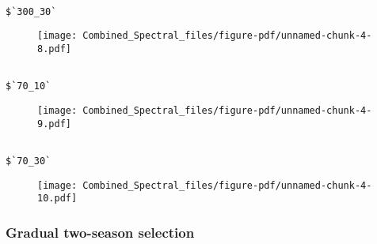 \documentclass[
  letterpaper,
  DIV=11,
  numbers=noendperiod]{scrartcl}
\newenvironment{Shaded}{\begin{snugshade}}{\end{snugshade}}
\newcommand{\FunctionTok}[1]{\textcolor[rgb]{0.28,0.35,0.67}{#1}}
\newcommand{\NormalTok}[1]{\textcolor[rgb]{0.00,0.23,0.31}{#1}}
\newcommand{\OtherTok}[1]{\textcolor[rgb]{0.00,0.23,0.31}{#1}}
\newcommand{\SpecialCharTok}[1]{\textcolor[rgb]{0.37,0.37,0.37}{#1}}
\newcommand{\StringTok}[1]{\textcolor[rgb]{0.13,0.47,0.30}{#1}}
\begin{document}
\begin{verbatim}

$`300_30`
\end{verbatim}

\begin{figure}[H]

{\centering \texttt{[image: Combined\_Spectral\_files/figure-pdf/unnamed-chunk-4-8.pdf]}

}

\end{figure}

\begin{verbatim}

$`70_10`
\end{verbatim}

\begin{figure}[H]

{\centering \texttt{[image: Combined\_Spectral\_files/figure-pdf/unnamed-chunk-4-9.pdf]}

}

\end{figure}

\begin{verbatim}

$`70_30`
\end{verbatim}

\begin{figure}[H]

{\centering \texttt{[image: Combined\_Spectral\_files/figure-pdf/unnamed-chunk-4-10.pdf]}

}

\end{figure}

\hypertarget{gradual-two-season-selection}{%
\subsubsection{Gradual two-season
selection}\label{gradual-two-season-selection}}

\begin{Shaded}
\end{Shaded}
\end{document}

